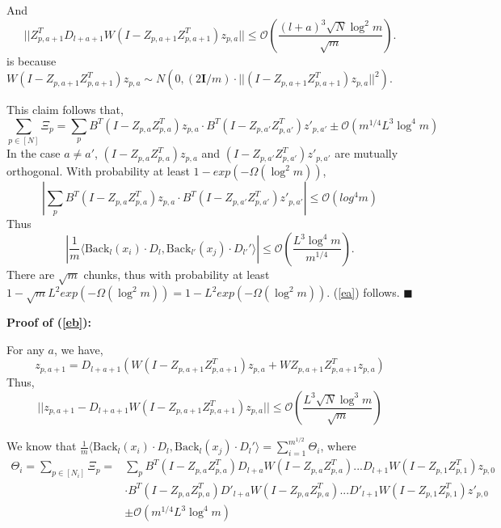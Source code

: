 \documentclass{article}
\newcommand{\cO}{\mathcal{O}}
\newcommand*{\QEDA}{\hfill\ensuremath{\blacksquare}}%
\begin{document}
And
\begin{equation}
||Z_{p,a+1}^TD_{l+a+1}W(I-Z_{p,a+1}Z_{p,a+1}^T)z_{p,a}||\leq \cO(\frac{(l+a)^3\sqrt{N}\log^2m}{\sqrt{m}}).
\end{equation}
is because $W(I-Z_{p,a+1}Z_{p,a+1}^T)z_{p,a}\sim N(0,(2\bm{I}/m) \cdot ||(I-Z_{p,a+1}Z_{p,a+1}^T)z_{p,a}||^2)$.

This claim follows that,
\begin{equation}
\sum_{p\in[N]} \Xi_p=\sum_p B^T(I-Z_{p,a}Z_{p,a}^T)z_{p,a}\cdot B^T(I-Z_{p,a'}Z_{p,a'}^T)z'_{p,a'}\pm \cO(m^{1/4}L^3\log^4{m})
\end{equation}
In the case $a\neq a'$, $(I-Z_{p,a}Z_{p,a}^T)z_{p,a}$ and $(I-Z_{p,a'}Z_{p,a'}^T)z'_{p,a'}$ are mutually orthogonal. With probability at least $1-exp(-\Omega(\log^2m))$,
\begin{equation}
|\sum_p B^T(I-Z_{p,a}Z_{p,a}^T)z_{p,a}\cdot B^T(I-Z_{p,a'}Z_{p,a'}^T)z'_{p,a'}|\leq  \cO(log^4m)
\end{equation}
Thus
\begin{equation}
|\frac{1}{m}\langle \text{Back}_l(x_i)\cdot D_l,\text{Back}_{l'}(x_j)\cdot D_{l'}' \rangle| \leq \cO(\frac{L^3\log^4 m}{m^{1/4}}).
\end{equation}
There are $\sqrt{m}$ chunks, thus with probability at least $1-\sqrt{m}L^2exp(-\Omega(\log^2m))=1-L^2exp(-\Omega(\log^2m))$.
(\ref{ea}) follows.
\QEDA

{\bf Proof of (\ref{eb}):}

For any $a$, we have,
\begin{equation}
z_{p,a+1}=D_{l+a+1}(W(I-Z_{p,a+1}Z_{p,a+1}^T)z_{p,a}+WZ_{p,a+1}Z_{p,a+1}^Tz_{p,a})
\end{equation}
Thus,
\begin{equation}
||z_{p,a+1}-D_{l+a+1}W(I-Z_{p,a+1}Z_{p,a+1}^T)z_{p,a}||\leq \cO(\frac{L^3\sqrt{N}\log^3m}{\sqrt{m}})
\end{equation}

We know that
$\frac{1}{m}\langle \text{Back}_l(x_i)\cdot D_l,\text{Back}_{l}(x_j)\cdot D_{l}' \rangle=\sum_{i=1}^{m^{1/2}} \Theta_i$, where
\begin{equation}
\begin{aligned}
\Theta_i=\sum_{p\in[N_i]} \Xi_p=&\sum_p B^T(I-Z_{p,a}Z_{p,a}^T)D_{l+a}W(I-Z_{p,a}Z_{p,a}^T)...D_{l+1}W(I-Z_{p,1}Z_{p,1}^T)z_{p,0}\\
&\cdot B^T(I-Z_{p,a}Z_{p,a}^T)D'_{l+a}W(I-Z_{p,a}Z_{p,a}^T)...D'_{l+1}W(I-Z_{p,1}Z_{p,1}^T)z'_{p,0}\\
&\pm \cO(m^{1/4}L^3\log^4{m})
\end{aligned}
\end{equation}
\end{document}
